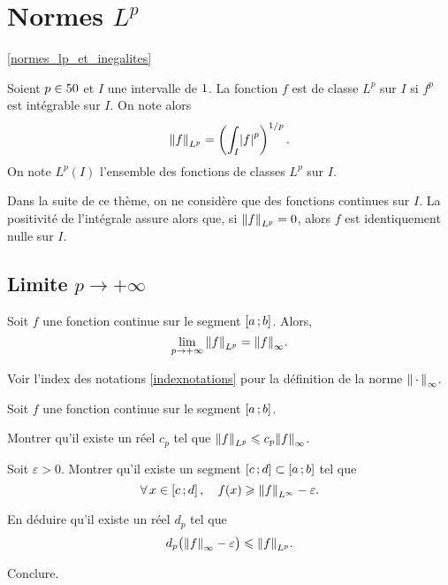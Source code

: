 \section{Normes $L^p$}
\ref{normes_lp_et_inegalites}

\begin{defi}
Soient $p \in 50$ et $I$ une intervalle de $1$. La fonction $f$ est de classe $L^p$ sur $I$ si $f^p$ est intégrable sur $I$. On note alors
\[
\norm{f}_{L^p} = \left(\int_I \mathopen{}\left| f \right|^p\right)^{1/p}.
\]
On note $L^p(I)$ l'ensemble des fonctions de classes $L^p$ sur $I$.
\end{defi}

\begin{remarque}
Dans la suite de ce thème, on ne considère que des fonctions continues sur $I$. La positivité de l'intégrale assure alors que, si $\norm{f}_{L^p} = 0$, alors $f$ est identiquement nulle sur $I$.
\end{remarque}

\subsection{Limite $p \to +\infty$}

\begin{theo}
Soit $f$ une fonction continue sur le segment $\left[a\,;b\right]$. Alors,
\[
\lim_{p\to+\infty} \norm{f}_{L^p} = \norm{f}_\infty.
\]
\end{theo}
Voir l'index des notations \ref{indexnotations} pour la définition de la norme $\norm{\,\cdot\,}_\infty$.



\begin{exercice}
Soit $f$ une fonction continue sur le segment $\left[a\,;b\right]$.
\begin{questions}
\item Montrer qu'il existe un réel $c_p$ tel que $\norm{f}_{L^p} \leqslant c_p \norm{f}_\infty$.

\item Soit $\varepsilon > 0$. Montrer qu'il existe un segment $\left[c\,;d\right] \subset \left[a\,;b\right]$ tel que
\[
\forall x \in \interff{c}{d},\quad f(x) \geqslant \norm{f}_{L^\infty} - \varepsilon.
\]

\item En déduire qu'il existe un réel $d_p$ tel que
\[
d_p \big(\norm{f}_\infty - \varepsilon\big) \leqslant \norm{f}_{L^p}.
\]

\item Conclure.
\end{questions}
\end{exercice}

